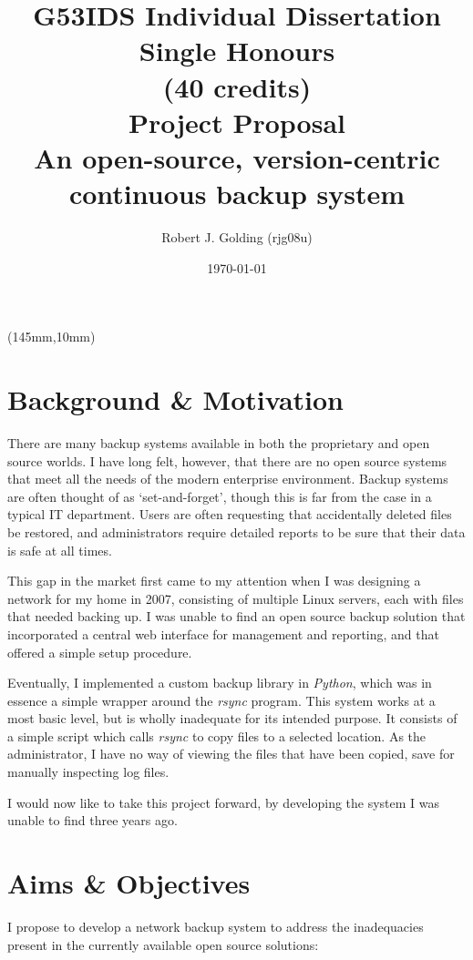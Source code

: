 \documentclass[a4paper]{article}
\title{
    \vspace{5cm}
    \huge{G53IDS Individual Dissertation Single Honours} \\[0.5cm]
    \Large{(40 credits)} \\[0.5cm]
    \LARGE{Project Proposal} \\[0.5cm]
    \Large{An open-source, version-centric continuous backup system} \\[0.2cm]
}
\author{Robert J. Golding (rjg08u)} \date{\today}
\begin{document}
    \begin{textblock*}{60mm}(145mm,10mm)
        
    \end{textblock*}
    \maketitle
    \thispagestyle{empty}
    \newpage

    \section{Background \& Motivation}

    There are many backup systems available in both the proprietary and open
    source worlds. I have long felt, however, that there are no open source
    systems that meet all the needs of the modern enterprise environment.
    Backup systems are often thought of as `set-and-forget', though this is far
    from the case in a typical IT department. Users are often requesting that
    accidentally deleted files be restored, and administrators require detailed
    reports to be sure that their data is safe at all times.

    This gap in the market first came to my attention when I was designing
    a network for my home in 2007, consisting of multiple Linux servers, each
    with files that needed backing up. I was unable to find an open source
    backup solution that incorporated a central web interface for management
    and reporting, and that offered a simple setup procedure.

    Eventually, I implemented a custom backup library in \emph{Python}, which
    was in essence a simple wrapper around the \emph{rsync} program. This
    system works at a most basic level, but is wholly inadequate for its
    intended purpose. It consists of a simple script which calls \emph{rsync}
    to copy files to a selected location. As the administrator, I have no way
    of viewing the files that have been copied, save for manually inspecting
    log files.

    I would now like to take this project forward, by developing the system
    I was unable to find three years ago.

    \section{Aims \& Objectives}

    I propose to develop a network backup system to address the inadequacies
    present in the currently available open source solutions:
\end{document}
